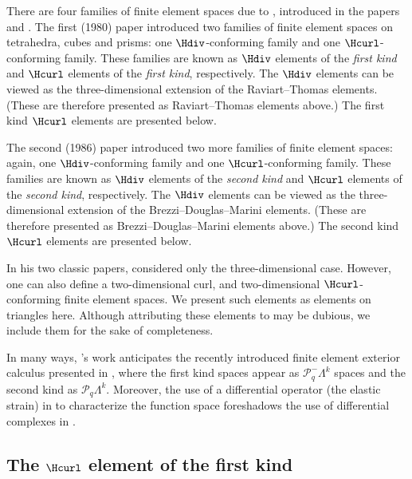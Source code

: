 There are four families of finite element spaces due to \nedelec,
introduced in the papers \citet{Nedelec1980} and \citet{Nedelec1986}.
The first (1980) paper introduced two families of finite element
spaces on tetrahedra, cubes and prisms: one $\Hdiv$-conforming family
and one $\Hcurl$-conforming family. These families are known as
\nedelec{} $\Hdiv$ elements of the \emph{first kind} and \nedelec{}
$\Hcurl$ elements of the \emph{first kind}, respectively. The $\Hdiv$
elements can be viewed as the three-dimensional extension of the
Raviart--Thomas elements. (These are therefore presented as
Raviart--Thomas elements above.) The first kind \nedelec{} $\Hcurl$
elements are presented below.

The second (1986) paper introduced two more families of finite element
spaces: again, one $\Hdiv$-conforming family and one
$\Hcurl$-conforming family. These families are known as \nedelec{}
$\Hdiv$ elements of the \emph{second kind} and \nedelec{} $\Hcurl$
elements of the \emph{second kind}, respectively. The $\Hdiv$ elements
can be viewed as the three-dimensional extension of the
Brezzi--Douglas--Marini elements. (These are therefore presented as
Brezzi--Douglas--Marini elements above.) The second kind \nedelec{}
$\Hcurl$ elements are presented below.

In his two classic papers, \nedelec{} considered only the
three-dimensional case. However, one can also define a two-dimensional
$\mathrm{curl}$, and two-dimensional $\Hcurl$-conforming finite
element spaces. We present such elements as \nedelec{} elements on
triangles here. Although attributing these elements to \nedelec{} may
be dubious, we include them for the sake of completeness.

In many ways, \nedelec{}'s work anticipates the recently introduced
finite element exterior calculus presented
in \citet{ArnoldFalkWinther2006}, where the first kind spaces appear as
\( \mathcal{P}_q^-\Lambda^k \) spaces and the second kind as \(
\mathcal{P}_q\Lambda^k \). Moreover, the use of a differential
operator (the elastic strain) in \citet{Nedelec1980} to characterize
the function space foreshadows the use of differential complexes
in \citet{ArnoldFalkWinther2006c}.

\subsection{The \nedelec{} $\Hcurl$ element of the first kind}
\label{sec:nedelec:first}


